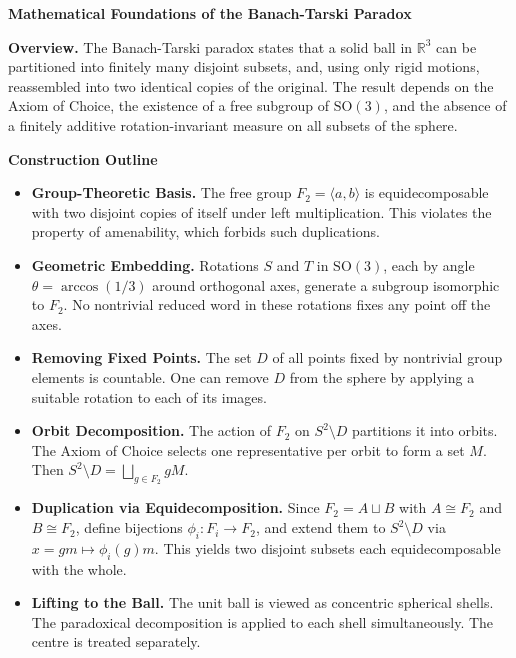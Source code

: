 \begin{technical}
{\Large\textbf{Mathematical Foundations of the Banach-Tarski Paradox}}

\textbf{Overview.}  
The Banach-Tarski paradox states that a solid ball in \(\mathbb{R}^3\) can be partitioned into finitely many disjoint subsets, and, using only rigid motions, reassembled into two identical copies of the original. The result depends on the Axiom of Choice, the existence of a free subgroup of \(\mathrm{SO}(3)\), and the absence of a finitely additive rotation-invariant measure on all subsets of the sphere.

\textbf{Construction Outline}
\begin{itemize}[leftmargin=*]
    \item \textbf{Group-Theoretic Basis.}  
    The free group \(F_2 = \langle a, b \rangle\) is equidecomposable with two disjoint copies of itself under left multiplication. This violates the property of amenability, which forbids such duplications.

    \item \textbf{Geometric Embedding.}  
    Rotations \(S\) and \(T\) in \(\mathrm{SO}(3)\), each by angle \(\theta = \arccos(1/3)\) around orthogonal axes, generate a subgroup isomorphic to \(F_2\). No nontrivial reduced word in these rotations fixes any point off the axes.

    \item \textbf{Removing Fixed Points.}  
    The set \(D\) of all points fixed by nontrivial group elements is countable. One can remove \(D\) from the sphere by applying a suitable rotation to each of its images.

    \item \textbf{Orbit Decomposition.}  
    The action of \(F_2\) on \(S^2 \setminus D\) partitions it into orbits. The Axiom of Choice selects one representative per orbit to form a set \(M\). Then \(S^2 \setminus D = \bigsqcup_{g \in F_2} gM\).

    \item \textbf{Duplication via Equidecomposition.}  
    Since \(F_2 = A \sqcup B\) with \(A \cong F_2\) and \(B \cong F_2\), define bijections \(\phi_i : F_i \to F_2\), and extend them to \(S^2 \setminus D\) via \(x = gm \mapsto \phi_i(g)m\). This yields two disjoint subsets each equidecomposable with the whole.

    \item \textbf{Lifting to the Ball.}  
    The unit ball is viewed as concentric spherical shells. The paradoxical decomposition is applied to each shell simultaneously. The centre is treated separately.
\end{itemize}


\end{technical}
